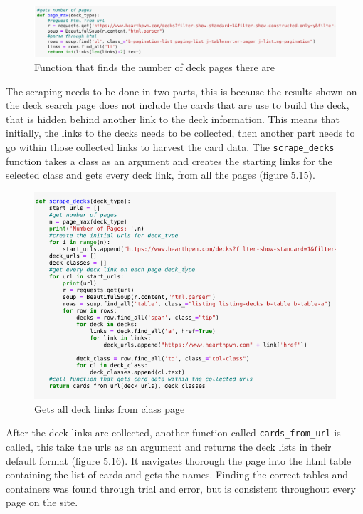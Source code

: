 \documentclass{report} %
\begin{document}
\begin{figure}[H]
\centering
\includegraphics[width=1.25\textwidth]{pageMax}
\caption{Function that finds the number of deck pages there are\protect}
 \label{board}
\end{figure}

The scraping needs to be done in two parts, this is because the results shown on the deck search page does not include the cards that are use to build the deck, that is hidden behind another link to the deck information. This means that initially, the links to the decks needs to be collected, then another part needs to go within those collected links to harvest the card data. The \nolinkurl{scrape_decks} function takes a class as an argument and creates the starting links for the selected class and gets every deck link, from all the pages (figure 5.15). 

\begin{figure}[H]
\centering
\includegraphics[width=1.25\textwidth]{scrapeDecks}
\caption{Gets all deck links from class page\protect}
 \label{board}
\end{figure}

After the deck links are collected, another function called \nolinkurl{cards_from_url} is called, this take the urls as an argument and returns the deck lists in their default format (figure 5.16). It navigates thorough the page into the html table containing the list of cards and gets the names. Finding the correct tables and containers was found through trial and error, but is consistent throughout every page on the site.
\end{document}
